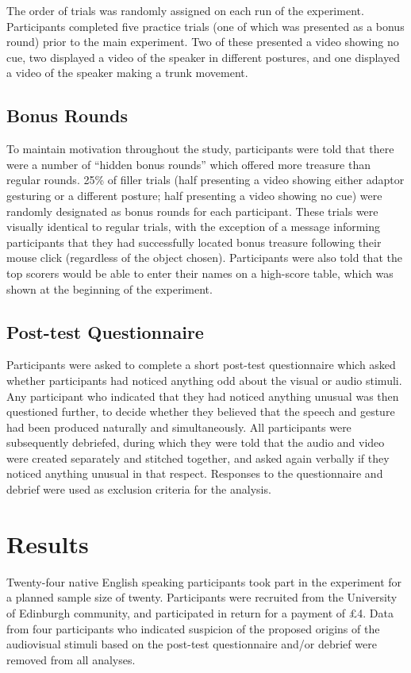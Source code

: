\documentclass[a4paper,man,natbib]{apa6}
\begin{document}
The order of trials was randomly assigned on each run of the experiment.
Participants completed five practice trials (one of which was presented as a bonus round) prior to the main experiment. 
Two of these presented a video showing no cue, two displayed a video of the speaker in different postures, and one displayed a video of the speaker making a trunk movement.


\subsection{Bonus Rounds}
To maintain motivation throughout the study, participants were told that there were a number of ``hidden bonus rounds'' which offered more treasure than regular rounds.
25\% of filler trials (half presenting a video showing either adaptor gesturing or a different posture; half presenting a video showing no cue) were randomly designated as bonus rounds for each participant.
These trials were visually identical to regular trials, with the exception of a message informing participants that they had successfully located bonus treasure following their mouse click (regardless of the object chosen).
Participants were also told that the top scorers would be able to enter their names on a high-score table, which was shown at the beginning of the experiment. 

\subsection{Post-test Questionnaire}
Participants were asked to complete a short post-test questionnaire which asked whether participants had noticed anything odd about the visual or audio stimuli.
Any participant who indicated that they had noticed anything unusual was then questioned further, to decide whether they believed that the speech and gesture had been produced naturally and simultaneously.
All participants were subsequently debriefed, during which they were told that the audio and video were created separately and stitched together, and asked again verbally if they noticed anything unusual in that respect. 
Responses to the questionnaire and debrief were used as exclusion criteria for the analysis.

\section{Results}
Twenty-four native English speaking participants took part in the experiment for a planned sample size of twenty.
Participants were recruited from the University of Edinburgh community, and participated in return for a payment of \pounds{}4.
Data from four participants who indicated suspicion of the proposed origins of the audiovisual stimuli based on the post-test questionnaire and/or debrief were removed from all analyses.
\end{document}
